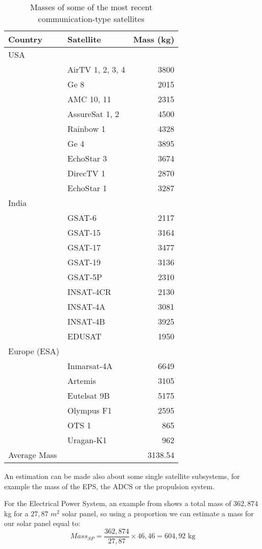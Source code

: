 	\begin{table}
		\centering
		\begin{tabular}{llr}
			\toprule
			Country & Satellite & Mass (kg)\\
			\midrule
				USA & & \\
				& AirTV 1, 2, 3, 4 & 3800\\
				& Ge 8 & 2015\\
				& AMC 10, 11 & 2315\\
				& AssureSat 1, 2 & 4500\\
				& Rainbow 1 & 4328\\
				& Ge 4 & 3895\\
				& EchoStar 3 & 3674\\
				& DirecTV 1 & 2870\\
				& EchoStar 1 & 3287\\
				India & & \\
				& GSAT-6 & 2117\\
				& GSAT-15 & 3164\\
				& GSAT-17 & 3477\\
				& GSAT-19 & 3136\\
				& GSAT-5P & 2310\\
				& INSAT-4CR & 2130\\
				& INSAT-4A & 3081\\
				& INSAT-4B & 3925\\
				& EDUSAT & 1950\\
				Europe (ESA) & & \\
				& Inmarsat-4A & 6649\\
				& Artemis & 3105\\
				& Eutelsat 9B & 5175\\
				& Olympus F1 & 2595\\
				& OTS 1 & 865\\
				& Uragan-K1 & 962\\
			\midrule
			Average Mass & & 3138.54\\
			\bottomrule
		\end{tabular}
		\caption{Masses of some of the most recent communication-type satellites}
		\label{tab:totmass}
	\end{table}
An estimation can be made also about some single satellite subsystems, for example the mass of the EPS, the ADCS or the propulsion system.

For the Electrical Power System, an example from \cite{Fox2008} shows a total mass of $362,874$ kg for a $27,87$ $m^2$ solar panel, so using a proportion we can estimate a mass for our solar panel equal to:
\begin{equation}
	Mass_{SP} = \frac{362,874}{27,87}\times 46,46 = 604,92 \text{ kg}
\end{equation}

